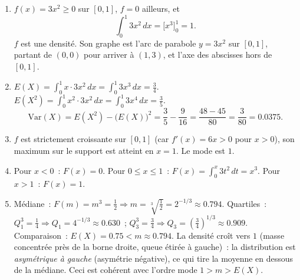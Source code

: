 \documentclass[11pt]{article}
\newcommand{\cle}[1]{{\popxbold\color{popdark}#1}}
\begin{document}
\begin{corrige}[{Exercice 5 — Densité polynomiale sur $[0,1]$ : $f(x)=3x^2$}]
\begin{enumerate}
\item $f(x) = 3x^2 \geq 0$ sur $[0,1]$, $f = 0$ ailleurs, et
\[ \int_0^1 3x^2\,dx = \Big[x^3\Big]_0^1 = 1. \]
$f$ est une densité. Son graphe est l'arc de parabole $y = 3x^2$ sur $[0,1]$, partant de $(0,0)$ pour arriver à $(1,3)$, et l'axe des abscisses hors de $[0,1]$.
\item $\displaystyle E(X) = \int_0^1 x \cdot 3x^2\,dx = \int_0^1 3x^3\,dx = \frac{3}{4}.$
$\displaystyle E(X^2) = \int_0^1 x^2 \cdot 3x^2\,dx = \int_0^1 3x^4\,dx = \frac{3}{5}.$
\[ \mathrm{Var}(X) = E(X^2) - \big(E(X)\big)^2 = \frac{3}{5} - \frac{9}{16} = \frac{48 - 45}{80} = \frac{3}{80} = 0.0375. \]
\item $f$ est strictement croissante sur $[0,1]$ (car $f'(x) = 6x > 0$ pour $x>0$), son maximum sur le support est atteint en $x = 1$. Le \cle{mode} est $1$.
\item Pour $x < 0$~: $F(x) = 0$. Pour $0 \leq x \leq 1$~: $F(x) = \displaystyle\int_0^x 3t^2\,dt = x^3$. Pour $x > 1$~: $F(x) = 1$.
\item Médiane~: $F(m) = m^3 = \tfrac12 \Rightarrow m = \sqrt[3]{\tfrac12} = 2^{-1/3} \approx 0.794$.
Quartiles~: $Q_1^3 = \tfrac14 \Rightarrow Q_1 = 4^{-1/3} \approx 0.630$~; $Q_3^3 = \tfrac34 \Rightarrow Q_3 = \left(\tfrac34\right)^{1/3} \approx 0.909$.
Comparaison~: $E(X) = 0.75 < m \approx 0.794$. La densité croît vers $1$ (masse concentrée près de la borne droite, queue étirée à gauche)~: la distribution est \emph{asymétrique à gauche} (asymétrie négative), ce qui tire la moyenne en dessous de la médiane. Ceci est cohérent avec l'ordre mode $1 > m > E(X)$.
\end{enumerate}
\end{corrige}
\end{document}
